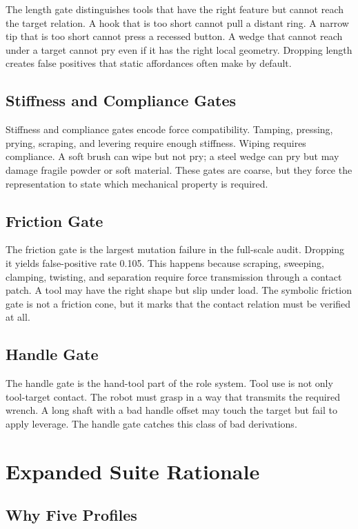 \documentclass{article}
\begin{document}
The length gate distinguishes tools that have the right feature but cannot reach the target relation. A hook that is too short cannot pull a distant ring. A narrow tip that is too short cannot press a recessed button. A wedge that cannot reach under a target cannot pry even if it has the right local geometry. Dropping length creates false positives that static affordances often make by default.

\subsection{Stiffness and Compliance Gates}

Stiffness and compliance gates encode force compatibility. Tamping, pressing, prying, scraping, and levering require enough stiffness. Wiping requires compliance. A soft brush can wipe but not pry; a steel wedge can pry but may damage fragile powder or soft material. These gates are coarse, but they force the representation to state which mechanical property is required.

\subsection{Friction Gate}

The friction gate is the largest mutation failure in the full-scale audit. Dropping it yields false-positive rate 0.105. This happens because scraping, sweeping, clamping, twisting, and separation require force transmission through a contact patch. A tool may have the right shape but slip under load. The symbolic friction gate is not a friction cone, but it marks that the contact relation must be verified at all.

\subsection{Handle Gate}

The handle gate is the hand-tool part of the role system. Tool use is not only tool-target contact. The robot must grasp in a way that transmits the required wrench. A long shaft with a bad handle offset may touch the target but fail to apply leverage. The handle gate catches this class of bad derivations.

\section{Expanded Suite Rationale}

\subsection{Why Five Profiles}
\end{document}
